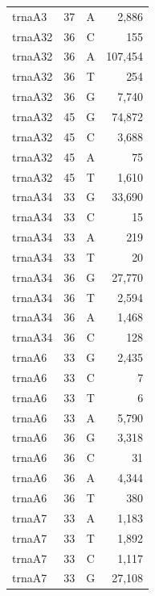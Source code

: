 \documentclass[12pt]{rockefeller}
\begin{document}
\begin{tiny}
\begin{longtable}{|l|r|c|r|}
  trnaA3 &        37 &          A &      2,886 \\
 trnaA32 &        36 &          C &        155 \\
 trnaA32 &        36 &          A &    107,454 \\
 trnaA32 &        36 &          T &        254 \\
 trnaA32 &        36 &          G &      7,740 \\
 trnaA32 &        45 &          G &     74,872 \\
 trnaA32 &        45 &          C &      3,688 \\
 trnaA32 &        45 &          A &         75 \\
 trnaA32 &        45 &          T &      1,610 \\
 trnaA34 &        33 &          G &     33,690 \\
 trnaA34 &        33 &          C &         15 \\
 trnaA34 &        33 &          A &        219 \\
 trnaA34 &        33 &          T &         20 \\
 trnaA34 &        36 &          G &     27,770 \\
 trnaA34 &        36 &          T &      2,594 \\
 trnaA34 &        36 &          A &      1,468 \\
 trnaA34 &        36 &          C &        128 \\
  trnaA6 &        33 &          G &      2,435 \\
  trnaA6 &        33 &          C &          7 \\
  trnaA6 &        33 &          T &          6 \\
  trnaA6 &        33 &          A &      5,790 \\
  trnaA6 &        36 &          G &      3,318 \\
  trnaA6 &        36 &          C &         31 \\
  trnaA6 &        36 &          A &      4,344 \\
  trnaA6 &        36 &          T &        380 \\
  trnaA7 &        33 &          A &      1,183 \\
  trnaA7 &        33 &          T &      1,892 \\
  trnaA7 &        33 &          C &      1,117 \\
  trnaA7 &        33 &          G &     27,108 \\

\end{longtable}
\end{tiny}
\end{document}
